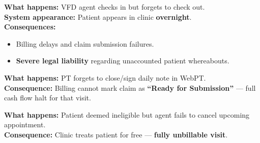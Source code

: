 \documentclass[11pt,a4paper]{article}
\begin{document}
\begin{tcolorbox}[dangerbox,title={Error \#5 --- Check-In / Check-Out Negligence (Legal Risk)}]
\textbf{What happens:} VFD agent checks in but forgets to check out.\\[0.3em]
\textbf{System appearance:} Patient appears in clinic \textbf{overnight}.\\[0.3em]
\textbf{Consequences:}
\begin{itemize}
  \item Billing delays and claim submission failures.
  \item \textbf{Severe legal liability} regarding unaccounted patient whereabouts.
\end{itemize}
\end{tcolorbox}

\begin{tcolorbox}[warnbox,title={Error \#6 --- Missing Medical Notes (Billing Halt)}]
\textbf{What happens:} PT forgets to close/sign daily note in WebPT.\\[0.3em]
\textbf{Consequence:} Billing cannot mark claim as \textbf{``Ready for Submission''} --- full cash flow halt for that visit.
\end{tcolorbox}

\begin{tcolorbox}[dangerbox,title={Error \#7 --- Inaccurate Eligibility Communication}]
\textbf{What happens:} Patient deemed ineligible but agent fails to cancel upcoming appointment.\\[0.3em]
\textbf{Consequence:} Clinic treats patient for free --- \textbf{fully unbillable visit}.
\end{tcolorbox}
\end{document}
